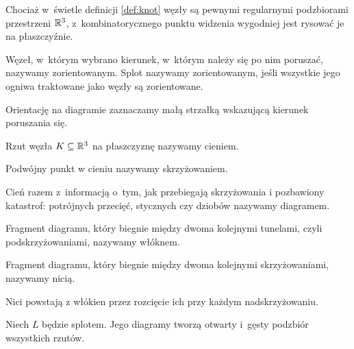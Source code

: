 
Chociaż w~świetle definicji \ref{def:knot} węzły są pewnymi regularnymi podzbiorami przestrzeni $\mathbb R^3$, z~kombinatorycznego punktu widzenia wygodniej jest rysować je na płaszczyźnie.

\begin{definition}[orientacja]
%
%
    Węzeł, w~którym wybrano kierunek, w~którym należy się po nim poruszać, nazywamy zorientowanym.
    Splot nazywamy zorientowanym, jeśli wszystkie jego ogniwa traktowane jako węzły są zorientowane.
\end{definition}

Orientację na diagramie zaznaczamy małą strzałką wskazującą kierunek poruszania się.

\begin{definition}
%
    Rzut węzła $K \subseteq \mathbb R^3$ na płaszczyznę nazywamy cieniem.
\end{definition}

\begin{definition}[skrzyżowanie]
%
    Podwójny punkt w cieniu nazywamy skrzyżowaniem.
\end{definition}

\begin{definition}[diagram]
%
    Cień razem z~informacją o~tym, jak przebiegają skrzyżowania i pozbawiony katastrof: potrójnych przecięć, stycznych czy dziobów nazywamy diagramem.
\end{definition}

\begin{definition}[włókno]
%
    Fragment diagramu, który biegnie między dwoma kolejnymi tunelami, czyli podskrzyżowaniami, nazywamy włóknem.
\end{definition}

\begin{definition}[nić]
%
    Fragment diagramu, który biegnie między dwoma kolejnymi skrzyżowaniami, nazywamy nicią.
\end{definition}

Nici powstają z włókien przez rozcięcie ich przy każdym nadskrzyżowaniu.

\begin{proposition}
    Niech $L$ będzie splotem.
    Jego diagramy tworzą otwarty i~gęsty podzbiór wszystkich rzutów.
\end{proposition}

